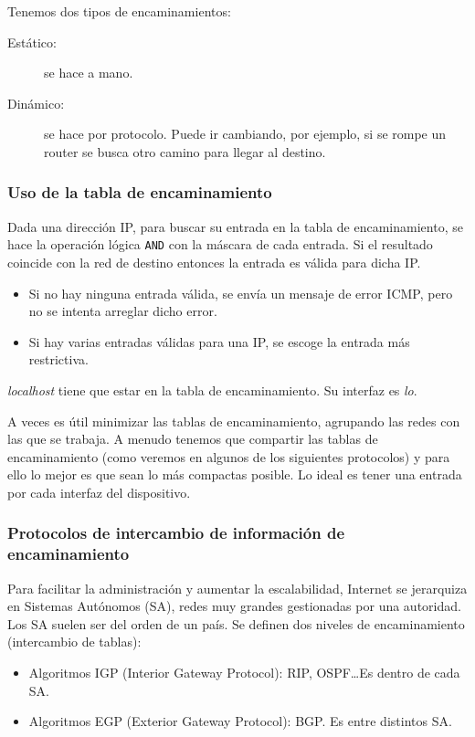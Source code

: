 \noindent
Tenemos dos tipos de encaminamientos:
\begin{description}
    \item [Estático:] se hace a mano.
    \item [Dinámico:] se hace por protocolo. Puede ir cambiando, por ejemplo, si se rompe un router se busca otro camino para llegar al destino.
\end{description}

\subsubsection{Uso de la tabla de encaminamiento}
Dada una dirección IP, para buscar su entrada en la tabla de encaminamiento, se hace la operación lógica \verb|AND| con la máscara de cada entrada. Si el resultado coincide con la red de destino entonces la entrada es válida para dicha IP\@.
\begin{itemize}
    \item Si no hay ninguna entrada válida, se envía un mensaje de error ICMP\@, pero no se intenta arreglar dicho error.
    \item Si hay varias entradas válidas para una IP\@, se escoge la entrada más restrictiva. 

\end{itemize}

\begin{observacion}
    \textit{localhost} tiene que estar en la tabla de encaminamiento. Su interfaz es \textit{lo}.
\end{observacion}

A veces es útil minimizar las tablas de encaminamiento, agrupando las redes con las que se trabaja. A menudo tenemos que compartir las tablas de encaminamiento (como veremos en algunos de los siguientes protocolos) y para ello lo mejor es que sean lo más compactas posible. Lo ideal es tener una entrada por cada interfaz del dispositivo. 

\subsubsection{Protocolos de intercambio de información de encaminamiento}

Para facilitar la administración y aumentar la escalabilidad, Internet se jerarquiza en Sistemas Autónomos (SA), redes muy grandes gestionadas por una autoridad. Los SA suelen ser del orden de un país. Se definen dos niveles de encaminamiento (intercambio de tablas):
\begin{itemize}
    \item Algoritmos IGP (Interior Gateway Protocol): RIP, OSPF\ldots Es dentro de cada SA.
    \item Algoritmos EGP (Exterior Gateway Protocol): BGP. Es entre distintos SA.
\end{itemize}

